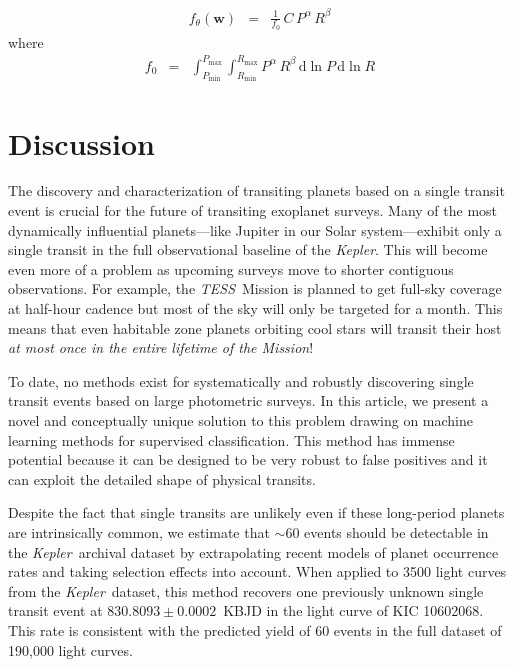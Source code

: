 \documentclass[preprint]{aastex}
\newcommand{\project}[1]{\textsl{#1}}
\newcommand{\kepler}{\project{Kepler}}
\newcommand{\tess}{\project{TESS}}
\newcommand{\paper}{article}
\newcommand{\sectlabel}[1]{\label{sect:#1}}
\newcommand{\dd}{\ensuremath{\,\mathrm{d}}}
\newcommand{\bvec}[1]{{\ensuremath{\boldsymbol{#1}}}}
\newcommand{\params}{{\ensuremath{\bvec{w}}}}
\newcommand{\poppars}{{\ensuremath{\theta}}}
\begin{document}
\begin{eqnarray}
f_\poppars (\params) &=& \frac{1}{f_0}\,C\,P^\alpha\,R^\beta
\end{eqnarray}
where
\begin{eqnarray}
f_0 &=&
    \int_{P_\mathrm{min}}^{P_\mathrm{max}}
    \int_{R_\mathrm{min}}^{R_\mathrm{max}}
    P^\alpha\,R^\beta\dd\ln P\dd\ln R
\end{eqnarray}



\section{Discussion}\sectlabel{discussion}

The discovery and characterization of transiting planets based on a single
transit event is crucial for the future of transiting exoplanet surveys.
Many of the most dynamically influential planets---like Jupiter in our Solar
system---exhibit only a single transit in the full observational baseline of
the \kepler.
This will become even more of a problem as upcoming surveys move to shorter
contiguous observations.
For example, the \tess\ Mission is planned to get full-sky coverage at
half-hour cadence but most of the sky will only be targeted for a month.
This means that even habitable zone planets orbiting cool stars will transit
their host \emph{at most once in the entire lifetime of the Mission}!

To date, no methods exist for systematically and robustly discovering single
transit events based on large photometric surveys.
In this \paper, we present a novel and conceptually unique solution to this
problem drawing on machine learning methods for supervised classification.
This method has immense potential because it can be designed to be very robust
to false positives and it can exploit the detailed shape of physical transits.

Despite the fact that single transits are unlikely even if these long-period
planets are intrinsically common, we estimate that $\sim 60$ events should be
detectable in the \kepler\ archival dataset by extrapolating recent models of
planet occurrence rates and taking selection effects into account.
When applied to 3500 light curves from the \kepler\ dataset, this method
recovers one previously unknown single transit event at
$830.8093\pm0.0002$~KBJD in the light curve of KIC 10602068.
This rate is consistent with the predicted yield of 60 events in the full
dataset of 190,000 light curves.
\end{document}
